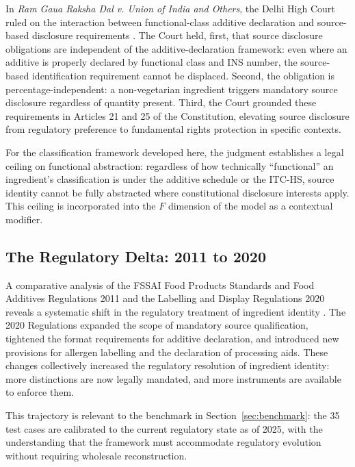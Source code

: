 \documentclass[12pt,a3paper]{article}
\begin{document}
In \textit{Ram Gaua Raksha Dal v. Union of India and Others}, the Delhi High Court ruled on the interaction between functional-class additive declaration and source-based disclosure requirements \cite{DelhiHC_RamGaua_2022}. The Court held, first, that source disclosure obligations are independent of the additive-declaration framework: even where an additive is properly declared by functional class and INS number, the source-based identification requirement cannot be displaced. Second, the obligation is percentage-independent: a non-vegetarian ingredient triggers mandatory source disclosure regardless of quantity present. Third, the Court grounded these requirements in Articles 21 and 25 of the Constitution, elevating source disclosure from regulatory preference to fundamental rights protection in specific contexts.

For the classification framework developed here, the judgment establishes a legal ceiling on functional abstraction: regardless of how technically ``functional'' an ingredient's classification is under the additive schedule or the ITC-HS, source identity cannot be fully abstracted where constitutional disclosure interests apply. This ceiling is incorporated into the $F$ dimension of the model as a contextual modifier.

\subsection{The Regulatory Delta: 2011 to 2020}

A comparative analysis of the FSSAI Food Products Standards and Food Additives Regulations 2011 and the Labelling and Display Regulations 2020 reveals a systematic shift in the regulatory treatment of ingredient identity \cite{FSSAI_RegulatoryDelta}. The 2020 Regulations expanded the scope of mandatory source qualification, tightened the format requirements for additive declaration, and introduced new provisions for allergen labelling and the declaration of processing aids. These changes collectively increased the regulatory resolution of ingredient identity: more distinctions are now legally mandated, and more instruments are available to enforce them.

This trajectory is relevant to the benchmark in Section~\ref{sec:benchmark}: the 35 test cases are calibrated to the current regulatory state as of 2025, with the understanding that the framework must accommodate regulatory evolution without requiring wholesale reconstruction.
\end{document}
